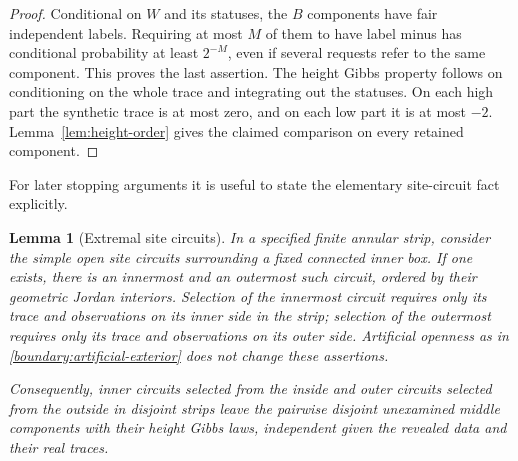 \documentclass[11pt]{article}
\newtheorem{lemma}[theorem]{Lemma}
\theoremstyle{definition}
\theoremstyle{remark}
\numberwithin{equation}{section}
\begin{document}
\begin{proof}
Conditional on $W$ and its statuses, the $B$ components have fair
independent labels.  Requiring at most $M$ of them to have label minus
has conditional probability at least $2^{-M}$, even if several
requests refer to the same component.  This proves the last
assertion.  The height Gibbs property follows on conditioning on the
whole trace and integrating out the statuses.  On each high part
the synthetic trace is at most zero, and on each low part it is at
most $-2$.  Lemma~\ref{lem:height-order} gives the claimed comparison
on every retained component.
\end{proof}

For later stopping arguments it is useful to state the elementary
site-circuit fact explicitly.

\begin{lemma}[Extremal site circuits]\label{boundary:extremal}
In a specified finite annular strip, consider the simple open site
circuits surrounding a fixed connected inner box.  If one exists,
there is an innermost and an outermost such circuit, ordered by their
geometric Jordan interiors.  Selection of the innermost circuit
requires only its trace and observations on its inner side in the
strip; selection of the outermost requires only its trace and
observations on its outer side.  Artificial openness as in
\eqref{boundary:artificial-exterior} does not change these assertions.

Consequently, inner circuits selected from the inside and outer
circuits selected from the outside in disjoint strips leave the
pairwise disjoint unexamined middle components with their height Gibbs laws, independent
given the revealed data and their real traces.
\end{lemma}
\end{document}
